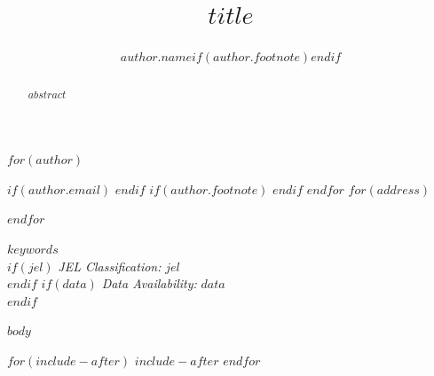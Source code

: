 \documentclass[authoryear,preprint,$layout$,12pt]{fmt/elsarticle}
\begin{document}
\begin{frontmatter}



\title{$title$}


$for(author)$
\author[$author.affiliation$]{$author.name$$if(author.footnote)$$endif$}
$if(author.email)$  $endif$
$if(author.footnote)$ $endif$
$endfor$
$for(address)$
\address[$address.code$]{$address.address$}
$endfor$

\begin{abstract}
$abstract$ \\
\end{abstract}

\begin{keyword}
\vspace{2.5mm} %
$keywords$ \\
\vspace{2.5mm} %
$if(jel)$
  \noindent\textit{JEL Classification:}
  $jel$ \\
  \vspace{2.5mm} %
$endif$
$if(data)$
  \noindent\textit{Data Availability:}
  $data$ \\
$endif$
\noindent\makebox[\linewidth]{\rule{\textwidth}{0.5pt}}
\end{keyword}

\end{frontmatter}


$body$



\begingroup
\singlespacing\setlength{\parskip}{1em}
 

\endgroup



\appendix
$for(include-after)$
$include-after$
$endfor$
\end{document}
